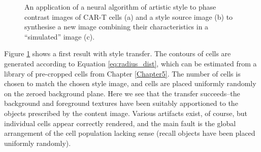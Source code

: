 \begin{figure}[h]%
    \centering
    \qquad
    \qquad
    \caption{An application of a neural algorithm of artistic style to phase contrast images of CAR-T cells (a) and a style source image (b) to synthesise a new image combining their characteristics in a ``simulated'' image (c).}%
    \label{fig:style_transfer_cells}
\end{figure}

Figure \ref{fig:style_transfer_cells} shows a first result with style transfer. The contours of cells are generated according to Equation \ref{eq:radius_dist}, which can be estimated from a library of pre-cropped cells from Chapter \ref{Chapter5}. The number of cells is chosen to match the chosen style image, and cells are placed uniformly randomly on the zeroed background plane. Here we see that the transfer succeeds--the background and foreground textures have been suitably apportioned to the objects prescribed by the content image. Various artifacts exist, of course, but individual cells appear correctly rendered, and the main fault is the global arrangement of the cell population lacking sense (recall objects have been placed uniformly randomly).

